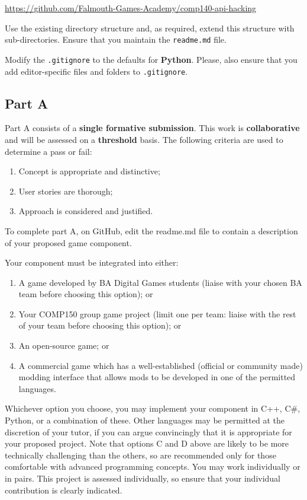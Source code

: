 \documentclass{../fal_assignment}
\begin{document}
\indent \url{https://github.com/Falmouth-Games-Academy/comp140-api-hacking }

Use the existing directory structure and, as required, extend this structure with sub-directories. Ensure that you maintain the \texttt{readme.md} file.

Modify the \texttt{.gitignore} to the defaults for \textbf{Python}. Please, also ensure that you add editor-specific files and folders to \texttt{.gitignore}. 

\subsection*{Part A}

Part A consists of a \textbf{single formative submission}. This work is \textbf{collaborative} and will be assessed on a \textbf{threshold} basis. The following criteria are used to determine a pass or fail:

\begin{enumerate}[label=(\alph*)]
	\item Concept is appropriate and distinctive;
	\item User stories are thorough;
	\item Approach is considered and justified.
\end{enumerate}

To complete part A, on GitHub, edit the readme.md file to contain a description of your proposed game component. 

Your component must be integrated into either:

\begin{enumerate}[label=(\alph*)]
	\item A game developed by BA Digital Games students (liaise with your chosen BA team before choosing this option); or 
	\item Your COMP150 group game project (limit one per team: liaise with the rest of your team before choosing this option); or 
	\item An open-source game; or
	\item A commercial game which has a well-established (official or community made) modding interface that allows mods to be developed in one of the permitted languages. 
\end{enumerate}

Whichever option you choose, you may implement your component in C++, C\#, Python, or a combination of these. Other languages may be permitted at the discretion of your tutor, if you can argue convincingly that it is appropriate for your proposed project. Note that options C and D above are likely to be more technically challenging than the others, so are recommended only for those comfortable with advanced programming concepts. You may work individually or in pairs. This project is assessed individually, so ensure that your individual contribution is clearly indicated.
\end{document}
